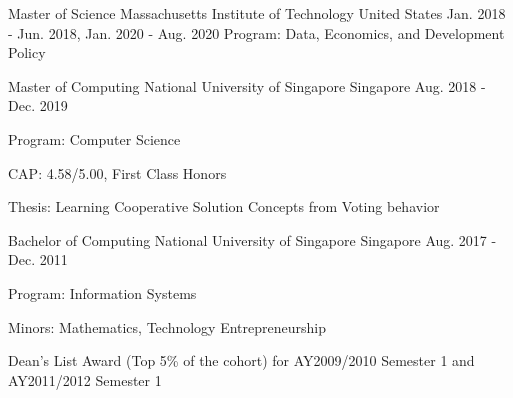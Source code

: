 

\begin{cventries}

  \cventry
    {Master of Science} %
    {Massachusetts Institute of Technology} %
    {United States} %
    {Jan. 2018 - Jun. 2018, Jan. 2020 - Aug. 2020} %
    {
      Program: Data, Economics, and Development Policy
    }

  \cventry
    {Master of Computing} %
    {National University of Singapore} %
    {Singapore} %
    {Aug. 2018 - Dec. 2019} %
    {
      Program: Computer Science
      \begin{cvitems} %
        \item CAP: 4.58/5.00, First Class Honors
        \item Thesis: Learning Cooperative Solution Concepts from Voting behavior
      \end{cvitems}
    }

  \cventry
    {Bachelor of Computing} %
    {National University of Singapore} %
    {Singapore} %
    {Aug. 2017 - Dec. 2011} %
    {
      Program: Information Systems
      \begin{cvitems} %
        \item Minors: Mathematics, Technology Entrepreneurship
        \item Dean’s List Award (Top 5\% of the cohort) for AY2009/2010 Semester 1 and AY2011/2012 Semester 1
      \end{cvitems}
    }

\end{cventries}
